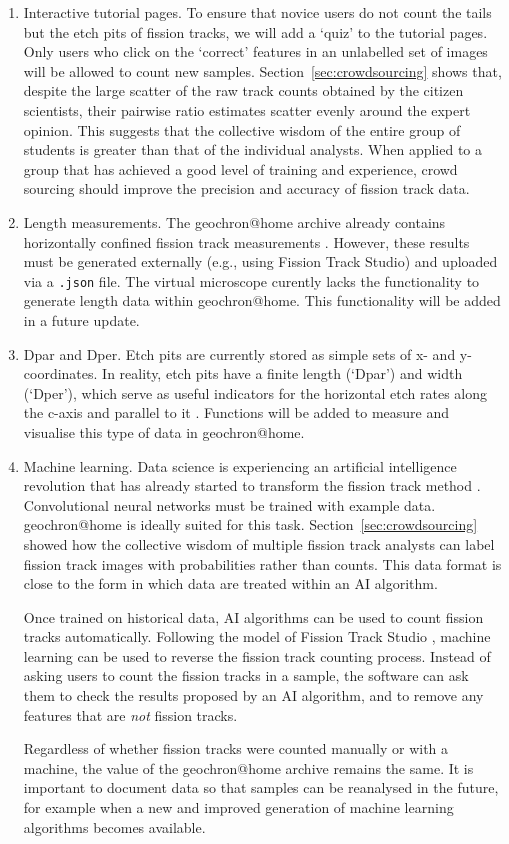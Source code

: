 \documentclass[gchron, manuscript]{copernicus}
\begin{document}
\begin{enumerate}
\item Interactive tutorial pages. To ensure that novice users do not
  count the tails but the etch pits of fission tracks, we will add a
  `quiz' to the tutorial pages. Only users who click on the `correct'
  features in an unlabelled set of images will be allowed to count new
  samples. Section~\ref{sec:crowdsourcing} shows that, despite the
  large scatter of the raw track counts obtained by the citizen
  scientists, their pairwise ratio estimates scatter evenly around the
  expert opinion. This suggests that the collective wisdom of the
  entire group of students is greater than that of the individual
  analysts. When applied to a group that has achieved a good level of
  training and experience, crowd sourcing should improve the precision
  and accuracy of fission track data.
\item Length measurements. The geochron@home archive already
  contains horizontally confined fission track measurements
  \citep{tamer2025}.  However, these results must be generated
  externally (e.g., using Fission Track Studio) and uploaded via a
  \texttt{.json} file.  The virtual microscope curently lacks the
  functionality to generate length data within
  geochron@home. This functionality will be added in a future
  update.
\item Dpar and Dper. Etch pits are currently stored as simple sets of
  x- and y-coordinates.  In reality, etch pits have a finite length
  (`Dpar') and width (`Dper'), which serve as useful indicators for
  the horizontal etch rates along the c-axis and parallel to it
  \citep{donelick1993}. Functions will be added to measure and
  visualise this type of data in geochron@home.
\item Machine learning. Data science is experiencing an artificial
  intelligence revolution that has already started to transform the
  fission track method \citep{nachtergaele2020}.  Convolutional neural
  networks must be trained with example data. geochron@home
  is ideally suited for this task. Section~\ref{sec:crowdsourcing}
  showed how the collective wisdom of multiple fission track analysts
  can label fission track images with probabilities rather than
  counts. This data format is close to the form in which data are
  treated within an AI algorithm.\medskip

  Once trained on historical data, AI algorithms can be used to count
  fission tracks automatically. Following the model of Fission Track
  Studio \citep{gleadow2009, gleadow2019}, machine learning can be
  used to reverse the fission track counting process. Instead of
  asking users to count the fission tracks in a sample, the software
  can ask them to check the results proposed by an AI algorithm, and
  to remove any features that are \emph{not} fission tracks.\medskip

  Regardless of whether fission tracks were counted manually or with a
  machine, the value of the geochron@home archive remains the
  same. It is important to document data so that samples can be
  reanalysed in the future, for example when a new and improved
  generation of machine learning algorithms becomes available.
\end{enumerate}
\end{document}
